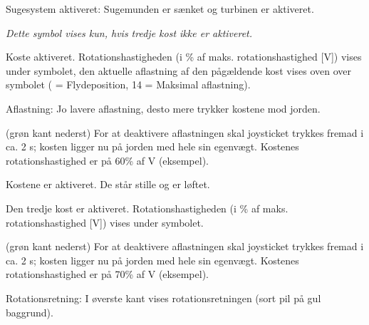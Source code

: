 \startSymVpad
{}
\SymVpad
{} Sugesystem aktiveret:
Sugemunden er sænket og turbinen er aktiveret.
\stopSymVpad



{\em Dette symbol vises kun, hvis tredje kost ikke er aktiveret.}

\startSymVpad
{}
\SymVpad
{} Koste aktiveret. Rotationshastigheden (i \% af maks. rotationshastighed [V]) vises under symbolet, den aktuelle aflastning af den pågældende kost vises oven over symbolet (\type{ } = Flydeposition, 14 = Maksimal aflastning).

{\md Aflastning:} {\lt Jo lavere aflastning, desto mere trykker kostene mod jorden.}
\stopSymVpad


\startSymVpad
{}
\SymVpad
{}(grøn kant nederst)
For at deaktivere aflastningen skal joysticket trykkes fremad i ca. 2 s; kosten ligger nu på jorden med hele sin egenvægt. Kostenes rotationshastighed er på 60\hairspace\% af V (eksempel).
\stopSymVpad

\startSymVpad
{}
\SymVpad
{} Kostene er aktiveret. De står stille og er løftet.
\stopSymVpad



\startSymVpad
{}
\SymVpad
{} Den tredje kost er aktiveret. Rotationshastigheden (i \% af maks. rotationshastighed [V]) vises under symbolet.
\stopSymVpad


\startSymVpad
{}
\SymVpad
{}(grøn kant nederst)
For at deaktivere aflastningen skal joysticket trykkes fremad i ca. 2 s; kosten ligger nu på jorden med hele sin egenvægt. Kostenes rotationshastighed er på 70\hairspace\% af V (eksempel).

{\md Rotationsretning:} {\lt I øverste kant vises rotationsretningen (sort pil på gul baggrund).}
\stopSymVpad

\stopsection






\startsection [title={Arbejde med tredje kost (ekstraudstyr)},
reference={sec:using:frontBrush},
]

